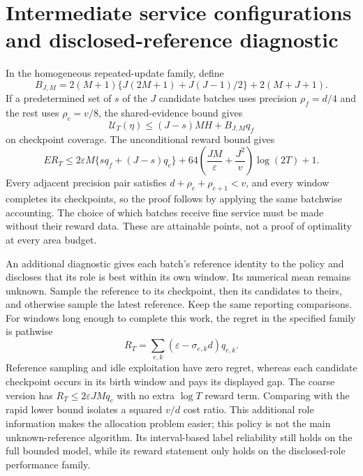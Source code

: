 \section{Intermediate service configurations and disclosed-reference diagnostic}
\label{app:variants}

In the homogeneous repeated-update family, define
\[
 B_{J,M}=2(M+1)\{J(2M+1)+J(J-1)/2\}+2(M+J+1).
\]
If a predetermined set of $s$ of the $J$ candidate batches uses precision
$\rho_f=d/4$ and the rest uses $\rho_c=v/8$, the shared-evidence bound gives
\[
 \mathcal U_T(\eta)\le(J-s)MH+B_{J,M}q_f
\]
on checkpoint coverage. The unconditional reward bound gives
\[
 ER_T\le2\varepsilon M\{sq_f+(J-s)q_c\}
 +64\left(\frac{JM}{\varepsilon}+\frac{J^2}{v}\right)\log(2T)+1.
\]
Every adjacent precision pair satisfies
$d+\rho_e+\rho_{e+1}<v$, and every window completes its checkpoints, so
the proof follows by applying the same batchwise accounting. The choice of
which batches receive fine service must be made without their reward data.
These are attainable points, not a proof of optimality at every area budget.

An additional diagnostic gives each batch's reference identity to the policy
and discloses that its role is best within its own window. Its numerical mean
remains unknown. Sample the reference to its checkpoint, then its candidates
to theirs, and otherwise sample the latest reference. Keep the same reporting
comparisons. For windows long enough to complete this work, the regret in the
specified family is pathwise
\[
 R_T=\sum_{e,k}(\varepsilon-\sigma_{e,k}d)q_{e,k}.
\]
Reference sampling and idle exploitation have zero regret, whereas each
candidate checkpoint occurs in its birth window and pays its displayed gap.
The coarse version has $R_T\le2\varepsilon JM q_c$ with no extra $\log T$
reward term. Comparing with the rapid lower bound isolates a squared
$v/d$ cost ratio. This additional role information makes the allocation
problem easier; this policy is not the main unknown-reference algorithm.
Its interval-based label reliability still holds on the full bounded model,
while its reward statement only holds on the disclosed-role performance family.
